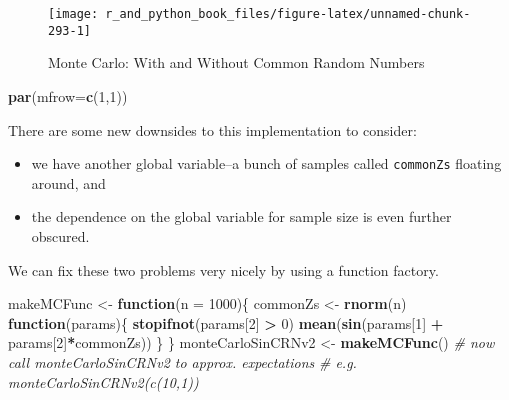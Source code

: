 \documentclass[12pt,krantz2]{krantz}
\makeatletter
\newenvironment{Shaded}{\begin{snugshade}}{\end{snugshade}}
\newcommand{\CommentTok}[1]{\textcolor[rgb]{0.37,0.37,0.37}{\textit{#1}}}
\newcommand{\ControlFlowTok}[1]{\textcolor[rgb]{0.27,0.27,0.27}{\textbf{#1}}}
\newcommand{\DataTypeTok}[1]{\textcolor[rgb]{0.27,0.27,0.27}{#1}}
\newcommand{\DecValTok}[1]{\textcolor[rgb]{0.06,0.06,0.06}{#1}}
\newcommand{\KeywordTok}[1]{\textcolor[rgb]{0.27,0.27,0.27}{\textbf{#1}}}
\newcommand{\NormalTok}[1]{#1}
\newcommand{\OperatorTok}[1]{\textcolor[rgb]{0.43,0.43,0.43}{\textbf{#1}}}
\newcommand{\StringTok}[1]{\textcolor[rgb]{0.5,0.5,0.5}{#1}}
\providecommand{\tightlist}{%
  \setlength{\itemsep}{0pt}\setlength{\parskip}{0pt}}
\newenvironment{kframe}{%
\medskip{}
\setlength{\fboxsep}{.8em}
 \def\at@end@of@kframe{}%
 \ifinner\ifhmode%
  \def\at@end@of@kframe{\end{minipage}}%
  \begin{minipage}{\columnwidth}%
 \fi\fi%
 \def\FrameCommand##1{\hskip\@totalleftmargin \hskip-\fboxsep
 \colorbox{shadecolor}{##1}\hskip-\fboxsep
     \hskip-\linewidth \hskip-\@totalleftmargin \hskip\columnwidth}%
 \MakeFramed {\advance\hsize-\width
   \@totalleftmargin\z@ \linewidth\hsize
   \@setminipage}}%
 {\par\unskip\endMakeFramed%
 \at@end@of@kframe}
\renewenvironment{Shaded}{\begin{kframe}}{\end{kframe}}
\makeatother
\begin{document}
\begin{figure}

{\centering \texttt{[image: r\_and\_python\_book\_files/figure-latex/unnamed-chunk-293-1]} 

}

\caption{Monte Carlo: With and Without Common Random Numbers}\label{fig:unnamed-chunk-293}
\end{figure}

\begin{Shaded}
\begin{Highlighting}[]
\KeywordTok{par}\NormalTok{(}\DataTypeTok{mfrow=}\KeywordTok{c}\NormalTok{(}\DecValTok{1}\NormalTok{,}\DecValTok{1}\NormalTok{))}
\end{Highlighting}
\end{Shaded}

There are some new downsides to this implementation to consider:

\begin{itemize}
\tightlist
\item
  we have another global variable--a bunch of samples called \texttt{commonZs} floating around, and
\item
  the dependence on the global variable for sample size is even further obscured.
\end{itemize}

We can fix these two problems very nicely by using a function factory.

\begin{Shaded}
\begin{Highlighting}[]
\NormalTok{makeMCFunc <-}\StringTok{ }\ControlFlowTok{function}\NormalTok{(}\DataTypeTok{n =} \DecValTok{1000}\NormalTok{)\{}
\NormalTok{  commonZs <-}\StringTok{ }\KeywordTok{rnorm}\NormalTok{(n)}
  \ControlFlowTok{function}\NormalTok{(params)\{}
    \KeywordTok{stopifnot}\NormalTok{(params[}\DecValTok{2}\NormalTok{] }\OperatorTok{>}\StringTok{ }\DecValTok{0}\NormalTok{) }
    \KeywordTok{mean}\NormalTok{(}\KeywordTok{sin}\NormalTok{(params[}\DecValTok{1}\NormalTok{] }\OperatorTok{+}\StringTok{ }\NormalTok{params[}\DecValTok{2}\NormalTok{]}\OperatorTok{*}\NormalTok{commonZs))    }
\NormalTok{  \}  }
\NormalTok{\}}
\NormalTok{monteCarloSinCRNv2 <-}\StringTok{ }\KeywordTok{makeMCFunc}\NormalTok{()}
\CommentTok{# now call monteCarloSinCRNv2 to approx. expectations}
\CommentTok{# e.g. monteCarloSinCRNv2(c(10,1))}
\end{Highlighting}
\end{Shaded}
\end{document}
